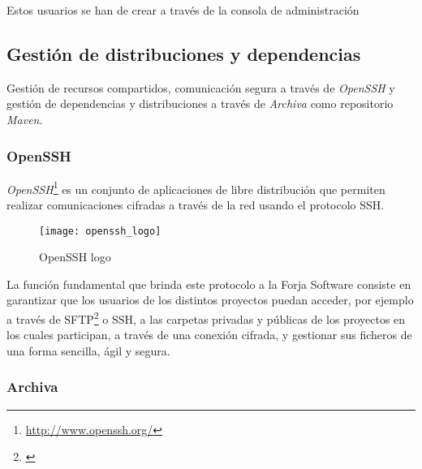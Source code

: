 \par Estos usuarios se han de crear a través de la consola de administración





\subsection{Gestión de distribuciones y dependencias}
\label{sub:distribuciones-dependencias}

\par Gestión de recursos compartidos, comunicación segura a través de \emph{OpenSSH} y gestión de dependencias y distribuciones a través de \emph{Archiva} como repositorio \emph{Maven}.

\subsubsection{OpenSSH}
\label{ssub:openssh}

\par \emph{OpenSSH}\footnote{\url{http://www.openssh.org/}} es un conjunto de aplicaciones de libre distribución que permiten realizar comunicaciones cifradas a través de la red usando el protocolo SSH.

\begin{figure}[H]
    \centering
    \texttt{[image: openssh\_logo]}
    \caption{OpenSSH logo}
    \label{fig:openssh_logo}
\end{figure}

\par La función fundamental que brinda este protocolo a la Forja Software consiste en garantizar que los usuarios de los distintos proyectos puedan acceder, por ejemplo a través de SFTP\footnote{\url{}} o SSH, a las carpetas privadas y públicas de los proyectos en los cuales participan, a través de una conexión cifrada, y gestionar sus ficheros de una forma sencilla, ágil y segura.


\subsubsection{Archiva}
\label{ssub:archiva}

